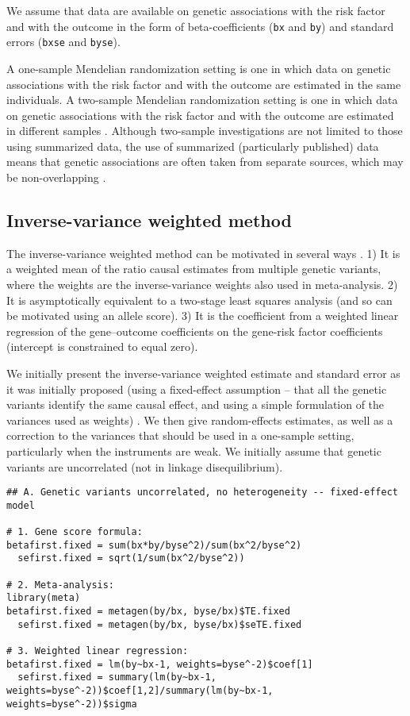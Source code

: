 \documentclass[a4paper,12pt]{article} %
\begin{document}
We assume that data are available on genetic associations with the risk factor and with the outcome in the form of beta-coefficients (\texttt{bx} and \texttt{by}) and standard errors (\texttt{bxse} and \texttt{byse}).

A one-sample Mendelian randomization setting is one in which data on genetic associations with the risk factor and with the outcome are estimated in the same individuals. A two-sample Mendelian randomization setting is one in which data on genetic associations with the risk factor and with the outcome are estimated in different samples \citep{pierce2013}. Although two-sample investigations are not limited to those using summarized data, the use of summarized (particularly published) data means that genetic associations are often taken from separate sources, which may be non-overlapping \citep{burgess2014twosample}.

\clearpage

\subsection{Inverse-variance weighted method}
The inverse-variance weighted method can be motivated in several ways \citep{burgess2013genepi}. 1) It is a weighted mean of the ratio causal estimates from multiple genetic variants, where the weights are the inverse-variance weights also used in meta-analysis. 2) It is asymptotically equivalent to a two-stage least squares analysis (and so can be motivated using an allele score). 3) It is the coefficient from a weighted linear regression of the gene--outcome coefficients on the gene-risk factor coefficients (intercept is constrained to equal zero).

We initially present the inverse-variance weighted estimate and standard error as it was initially proposed (using a fixed-effect assumption -- that all the genetic variants identify the same causal effect, and using a simple formulation of the variances used as weights) . We then give random-effects estimates, as well as a correction to the variances that should be used in a one-sample setting, particularly when the instruments are weak. We initially assume that genetic variants are uncorrelated (not in linkage disequilibrium).

\begin{lstlisting}
## A. Genetic variants uncorrelated, no heterogeneity -- fixed-effect model

# 1. Gene score formula:
betafirst.fixed = sum(bx*by/byse^2)/sum(bx^2/byse^2)
  sefirst.fixed = sqrt(1/sum(bx^2/byse^2))

# 2. Meta-analysis:
library(meta)
betafirst.fixed = metagen(by/bx, byse/bx)$TE.fixed
  sefirst.fixed = metagen(by/bx, byse/bx)$seTE.fixed

# 3. Weighted linear regression:
betafirst.fixed = lm(by~bx-1, weights=byse^-2)$coef[1]
  sefirst.fixed = summary(lm(by~bx-1, weights=byse^-2))$coef[1,2]/summary(lm(by~bx-1, weights=byse^-2))$sigma
\end{lstlisting}
\end{document}
